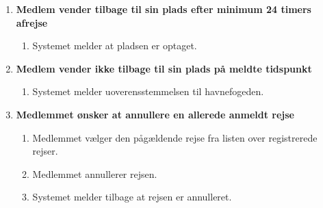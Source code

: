 \begin{enumerate}
    \item{\bf{Medlem vender tilbage til sin plads efter minimum 24 timers afrejse}}
      \begin{enumerate}
        \item Systemet melder at pladsen er optaget.
      \end{enumerate}


    \item{\bf{Medlem vender ikke tilbage til sin plads på meldte tidspunkt}}
      \begin{enumerate}
        \item Systemet melder uoverensstemmelsen til havnefogeden.
      \end{enumerate}


    \item{\bf{Medlemmet ønsker at annullere en allerede anmeldt rejse}}
      \begin{enumerate}
        \item Medlemmet vælger den pågældende rejse fra listen over registrerede rejser.
        \item Medlemmet annullerer rejsen.
        \item Systemet melder tilbage at rejsen er annulleret.
      \end{enumerate}


  \end{enumerate}
